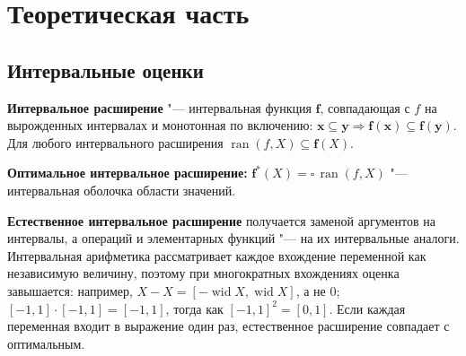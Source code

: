 \documentclass[12pt,a4paper]{article}
\newcommand{\ran}{\operatorname{ran}}
\newcommand{\wid}{\operatorname{wid}}
\newcommand{\bfx}{\mathbf{x}}
\newcommand{\bfy}{\mathbf{y}}
\newcommand{\bff}{\mathbf{f}}
\begin{document}
\section{Теоретическая часть}

\subsection*{Интервальные оценки}

\textbf{Интервальное расширение} "--- интервальная функция $\bff$, совпадающая с $f$ на вырожденных интервалах и монотонная по включению: $\bfx\subseteq\bfy\Rightarrow\bff(\bfx)\subseteq\bff(\bfy)$. Для любого интервального расширения $\ran(f,X)\subseteq\bff(X)$.

\textbf{Оптимальное интервальное расширение:} $\bff^{*}(X)=\square\,\ran(f,X)$ "--- интервальная оболочка области значений.

\textbf{Естественное интервальное расширение} получается заменой аргументов на интервалы, а операций и элементарных функций "--- на их интервальные аналоги. Интервальная арифметика рассматривает каждое вхождение переменной как независимую величину, поэтому при многократных вхождениях оценка завышается: например, $X-X=[-\wid X,\wid X]$, а не $0$; $[-1,1]\cdot[-1,1]=[-1,1]$, тогда как $[-1,1]^2=[0,1]$. Если каждая переменная входит в выражение один раз, естественное расширение совпадает с оптимальным.
\end{document}
